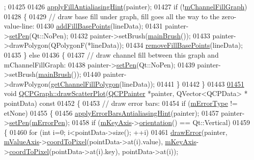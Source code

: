 \begin{DoxyCode}
      ;
01425   
01426   \hyperlink{a00024_ac08a480155895e674dbfe5a5670e0ff3}{applyFillAntialiasingHint}(painter);
01427   \textcolor{keywordflow}{if} (!\hyperlink{a00031_aa49af2f241d9ffdc301a24f08b10bdc8}{mChannelFillGraph})
01428   \{
01429     \textcolor{comment}{// draw base fill under graph, fill goes all the way to the zero-value-line:}
01430     \hyperlink{a00031_a5fa7884620d7c54b81dfbd255d97b636}{addFillBasePoints}(lineData);
01431     painter->\hyperlink{a00047_af9c7a4cd1791403901f8c5b82a150195}{setPen}(Qt::NoPen);
01432     painter->setBrush(\hyperlink{a00024_ae74c123832da180c17e22203e748d9b7}{mainBrush}());
01433     painter->drawPolygon(QPolygonF(*lineData));
01434     \hyperlink{a00031_ad31b49a90e91e538fd9caf011c913a68}{removeFillBasePoints}(lineData);
01435   \} \textcolor{keywordflow}{else}
01436   \{
01437     \textcolor{comment}{// draw channel fill between this graph and mChannelFillGraph:}
01438     painter->\hyperlink{a00047_af9c7a4cd1791403901f8c5b82a150195}{setPen}(Qt::NoPen);
01439     painter->setBrush(\hyperlink{a00024_ae74c123832da180c17e22203e748d9b7}{mainBrush}());
01440     painter->drawPolygon(\hyperlink{a00031_a0374b7268e35cab9802a6be2b5d726d7}{getChannelFillPolygon}(lineData));
01441   \}
01442 \}
01443 
\hypertarget{a00115_source_l01451}{}\hyperlink{a00031_af1872a60bed7acb3f3b17bfae3f4764c}{01451} \textcolor{keywordtype}{void} \hyperlink{a00031_af1872a60bed7acb3f3b17bfae3f4764c}{QCPGraph::drawScatterPlot}(\hyperlink{a00047}{QCPPainter} *painter, QVector<QCPData> *
      pointData)\textcolor{keyword}{ const}
01452 \textcolor{keyword}{}\{
01453   \textcolor{comment}{// draw error bars:}
01454   \textcolor{keywordflow}{if} (\hyperlink{a00031_a29e64273db201aeadebc61c870720a36}{mErrorType} != etNone)
01455   \{
01456     \hyperlink{a00024_af687bfe6160255960558eb71f1f81e73}{applyErrorBarsAntialiasingHint}(painter);
01457     painter->\hyperlink{a00047_af9c7a4cd1791403901f8c5b82a150195}{setPen}(\hyperlink{a00031_aa35681a24165c2831301091a87b662ce}{mErrorPen});
01458     \textcolor{keywordflow}{if} (\hyperlink{a00024_a692421b963472fa6e16156a74ba96832}{mKeyAxis}->\hyperlink{a00025_a57483f2f60145ddc9e63f3af53959265}{orientation}() == Qt::Vertical)
01459     \{
01460       \textcolor{keywordflow}{for} (\textcolor{keywordtype}{int} i=0; i<pointData->size(); ++i)
01461         \hyperlink{a00031_a4df6807066ce877705e999773e7ffbc4}{drawError}(painter, \hyperlink{a00024_acfc46d619ab9598be33b64146da45822}{mValueAxis}->\hyperlink{a00025_a985ae693b842fb0422b4390fe36d299a}{coordToPixel}(pointData->at(i).value),
       \hyperlink{a00024_a692421b963472fa6e16156a74ba96832}{mKeyAxis}->\hyperlink{a00025_a985ae693b842fb0422b4390fe36d299a}{coordToPixel}(pointData->at(i).key), pointData->at(i));

\end{DoxyCode}
